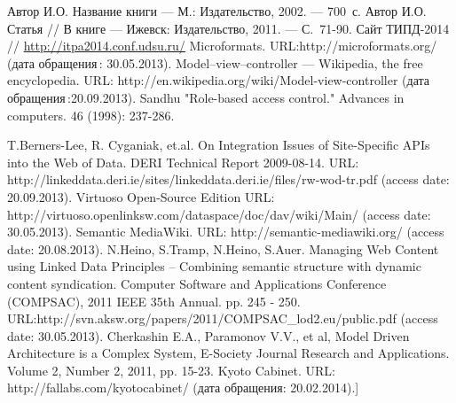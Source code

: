 \documentclass[utf8]{../IncArticle}
\begin{document}
\begin{thebibliography}{11}
 Автор И.О. Название книги --- М.: Издательство, 2002. --- 700~с.
 Автор И.О. Статья // В книге --- Ижевск: Издательство, 2011. --- С.~71-90.
 Сайт ТИПД-2014 // \url{http://itpa2014.conf.udsu.ru/}
 Microformats. URL:http://microformats.org/ (дата обращения\,: 30.05.2013).
 Model–view–controller --- Wikipedia, the free encyclopedia. URL: http://en.wikipedia.org/wiki/Model-view-controller (дата обращения\,:20.09.2013).
 Sandhu "Role-based access control." Advances in computers. 46 (1998): 237-286.

 T.Berners-Lee, R. Cyganiak, et.al. On Integration Issues of Site-Specific APIs into the Web of Data. DERI Technical Report 2009-08-14. URL: http://linkeddata.deri.ie/sites/linkeddata.deri.ie/files/rw-wod-tr.pdf (access date: 20.09.2013).
 Virtuoso Open-Source Edition URL: http://virtuoso.openlinksw.com/dataspace/doc/dav/wiki/Main/ (access date: 30.05.2013).
 Semantic MediaWiki. URL: http://semantic-mediawiki.org/ (access date: 20.08.2013).
 N.Heino, S.Tramp, N.Heino, S.Auer. Managing Web
  Content using Linked Data Principles – Combining semantic structure
  with dynamic content syndication. Computer Software and Applications
  Conference (COMPSAC), 2011 IEEE 35th Annual. pp. 245 -
  250. URL:http://svn.aksw.org/papers/2011/COMPSAC\_lod2.eu/public.pdf
  (access date: 30.05.2013).
 Cherkashin E.A., Paramonov V.V., et al, Model Driven Architecture is a Complex System, E-Society Journal Research and Applications. Volume 2, Number 2, 2011, pp. 15-23.
 Kyoto Cabinet. URL: http://fallabs.com/kyotocabinet/ (дата обращения: 20.02.2014).]

\end{thebibliography}

\end{document}
